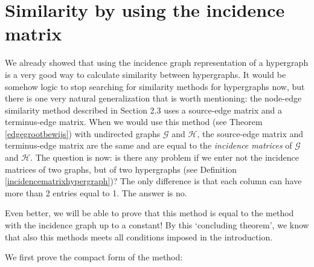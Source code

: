 \documentclass[a4paper,11pt]{report}
\newcommand{\graf}{\mathscr{G}}
\newcommand{\grafeen}{\mathscr{H}}
\begin{document}
\newpage
  \section{Similarity by using the incidence matrix}

We already showed that using the incidence graph representation of a hypergraph
is a very good way to calculate similarity between hypergraphs. It would be somehow logic to stop searching for similarity methods
for hypergraphs now, but there is one very natural generalization that is worth mentioning: the node-edge similarity 
method described in Section 2.3 uses a source-edge matrix and a terminus-edge 
matrix. When we would use this method (see Theorem \ref{edgegrootbewijs}) with undirected graphs $\graf$ and $\grafeen$, the source-edge matrix and terminus-edge
matrix are the same and are equal to the \textit{incidence matrices} of $\graf$ and 
$\grafeen$. The question is now: is there any problem if we enter not the incidence matrices of two graphs, but of 
two hypergraphs (see Definition \ref{incidencematrixhypergraph})? The only difference is that each
column can have more than 2 entries equal to 1. The answer is 
no. 

Even better, we will be able to prove that this method is equal to the method with the incidence graph up to a 
constant! By this `concluding theorem', we know that also this methods meets all 
conditions imposed in the introduction. 

We first prove the compact form of the method:
\end{document}
